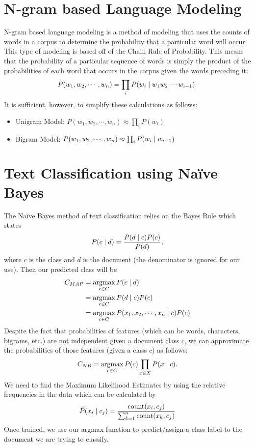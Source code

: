 \documentclass[12pt]{report}
\begin{document}
\section{N-gram based Language Modeling}
N-gram based language modeling is a method of modeling that uses the counts of
words in a corpus to determine the probability that a particular word will
occur.  This type of modeling is based off of the Chain Rule of Probability.
This means that the probability of a particular sequence of words is simply the
product of the probabilities of each word that occurs in the corpus given the
words preceding it:
\[ P(w_1, w_2, \cdots, w_n) = \prod_i P\giventhat{w_i}{w_1w_2\cdots w_{i - 1}}. \]
It is sufficient, however, to simplify these calculations as follows:
\begin{itemize}
  \item Unigram Model: $P(w_1, w_2, \cdots, w_n) \approx \prod_i P(w_i)$
  \item Bigram Model: $P(w_1, w_2, \cdots, w_n) \approx \prod_i P\giventhat{w_i}{w_{i-1}}$
\end{itemize}

\section{Text Classification using Na\"ive Bayes}
The Na\"ive Bayes method of text classification relies on the Bayes Rule which
states
\[ P\giventhat{c}{d} = \frac{P\giventhat{d}{c}P(c)}{P(d)}, \]
where $c$ is the class and $d$ is the document (the denominator is ignored
for our use).
Then our predicted class will be
\begin{align*}
  C_{MAP} &= \operatorname*{argmax}\limits_{c \in C} P\giventhat{c}{d}\\
  &= \operatorname*{argmax}\limits_{c \in C}P\giventhat{d}{c}P(c)\\
  &= \operatorname*{argmax}\limits_{c \in C}P\giventhat{x_1, x_2, \cdots, x_n}{c}P(c)
\end{align*}
Despite the fact that probabilities of features (which can be words, characters,
bigrams, etc.) are not independent given a document class $c$, we can
approximate the probabilities of those features (given a class $c$) as follows:
\[ C_{NB} = \operatorname*{argmax}\limits_{c \in C}P(c)\prod_{x\in
X}P\giventhat{x}{c}. \]
We need to find the Maximum Likelihood Estimates by using the relative
frequencies in the data which can be calculated by
\[ \hat{P}\giventhat{x_i}{c_j} = \frac{\operatorname*{count}(x_i, c_j)}{\sum_{k
= 1}^{n}\operatorname*{count}(x_k, c_j)} \]
Once trained, we use our argmax function to predict/assign a class label to the
document we are trying to classify.
\end{document}
